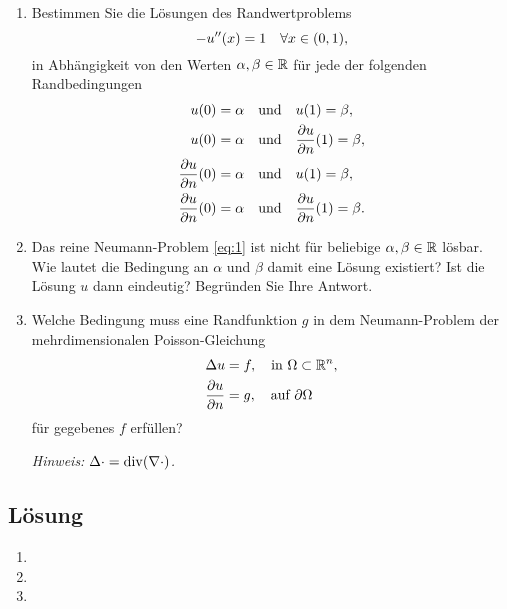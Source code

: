 \documentclass{exercise}
\begin{document}
    \begin{problem}
        \begin{enumerate}
            \item Bestimmen Sie die Lösungen des Randwertproblems
            \[
                -u''\parentheses*{x} = 1 \quad \forall x \in \parentheses*{0, 1},
            \]
            in Abhängigkeit von den Werten \(\alpha, \beta \in \mathbb{R}\) für jede der folgenden Randbedingungen
            \begin{align}
                u\parentheses*{0} = \alpha \quad &\text{und} \quad u\parentheses*{1} = \beta,\nonumber\\
                u\parentheses*{0} = \alpha \quad &\text{und} \quad \frac{\partial u}{\partial n}\parentheses*{1} = \beta,\nonumber\\
                \frac{\partial u}{\partial n}\parentheses*{0} = \alpha \quad &\text{und} \quad u\parentheses*{1} = \beta,\nonumber\\
                \frac{\partial u}{\partial n}\parentheses*{0} = \alpha \quad &\text{und} \quad \frac{\partial u}{\partial n}\parentheses*{1} = \beta.\label{eq:1}
            \end{align}
            \item Das reine Neumann-Problem \eqref{eq:1} ist nicht für beliebige \(\alpha, \beta \in \mathbb{R}\) lösbar.
            Wie lautet die Bedingung an \(\alpha\) und \(\beta\) damit eine Lösung existiert?
            Ist die Lösung \(u\) dann eindeutig?
            Begründen Sie Ihre Antwort.
            \item Welche Bedingung muss eine Randfunktion \(g\) in dem Neumann-Problem der mehrdimensionalen Poisson-Gleichung
            \begin{align*}
                \Delta u &= f, \quad \text{in }\Omega \subset \mathbb{R}^n,\\
                \frac{\partial u}{\partial n} &= g, \quad \text{auf }\partial\Omega
            \end{align*}
            für gegebenes \(f\) erfüllen?

            \emph{Hinweis: \(\Delta\cdot = \vecdiv\parentheses*{\nabla\cdot}\).}
        \end{enumerate}
    \end{problem}
    
    \subsection*{Lösung}
    \begin{enumerate}
        \item
        \item
        \item
    \end{enumerate}
\end{document}
